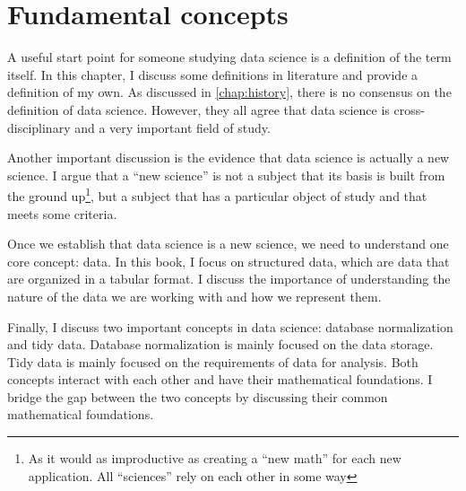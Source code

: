 \chapter{Fundamental concepts}
\label{chap:data}


A useful start point for someone studying data science is a definition of the term itself.
In this chapter, I discuss some definitions in literature and provide a definition of my
own.  As discussed in \cref{chap:history}, there is no consensus on the definition of data
science.  However, they all agree that data science is cross-disciplinary and a very
important field of study.

Another important discussion is the evidence that data science is actually a new science.
I argue that a ``new science'' is not a subject that its basis is built from the ground
up\footnote{As it would as improductive as creating a ``new math'' for each new
application.  All ``sciences'' rely on each other in some way}, but a subject that has a
particular object of study and that meets some criteria.

Once we establish that data science is a new science, we need to understand one core
concept: data.  In this book, I focus on structured data, which are data that are organized
in a tabular format.  I discuss the importance of understanding the nature of the data we
are working with and how we represent them.

Finally, I discuss two important concepts in data science: database normalization and tidy
data.  Database normalization is mainly focused on the data storage.  Tidy data is mainly
focused on the requirements of data for analysis.  Both concepts interact with each other
and have their mathematical foundations.  I bridge the gap between the two concepts by
discussing their common mathematical foundations.

